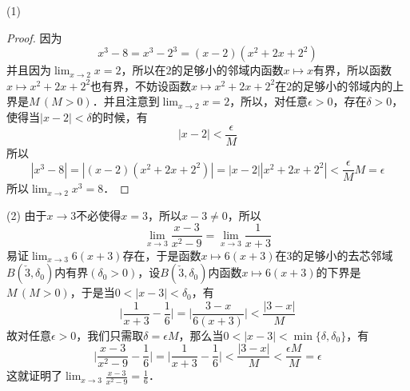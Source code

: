 (1)
\begin{proof}
因为
\begin{equation}
    x^3 - 8 = x^3 - 2^3 = (x-2)(x^2 + 2x + 2^2)
\end{equation}
并且因为$\displaystyle\lim_{x \to 2} x = 2$，所以在$2$的足够小的邻域内函数$x \longmapsto x$有界，所以函数$x \longmapsto x^2+2x+2^2$也有界，不妨设函数$x \longmapsto x^2+2x+2^2$在$2$的足够小的邻域内的上界是$M \, (M > 0)$．并且注意到$\displaystyle\lim_{x \to 2} x = 2$，所以，对任意$\epsilon > 0$，存在$\delta > 0$，使得当$|x - 2| < \delta$的时候，有
\begin{equation}
    |x - 2| < \frac{\epsilon}{M}
\end{equation}
所以
\begin{equation}
    |x^3-8|=|(x-2)(x^2+2x+2^2)|=|x-2||x^2+2x+2^2|<\frac{\epsilon}{M}M=\epsilon
\end{equation}
所以$\displaystyle\lim_{x \to 2} x^3 = 8$．
\end{proof} 

(2)
由于$x \to 3$不必使得$x = 3$，所以$x-3 \neq 0$，所以
\begin{equation}
    \lim_{x \to 3} \frac{x-3}{x^2 - 9} = \lim_{x \to 3} \frac{1}{x+3}
\end{equation}
易证$\displaystyle\lim_{x \to 3} 6(x+3)$存在，于是函数$x \longmapsto 6(x+3)$在$3$的足够小的去芯邻域$B(\check{3}, \delta_0)$内有界$(\delta_0 > 0)$，设$B(\check{3}, \delta_0)$内函数$x \longmapsto 6(x+3)$的下界是$M \, (M > 0)$，于是当$0<|x-3|<\delta_0$，有
\begin{equation}
    \bigg\lvert \frac{1}{x+3}-\frac{1}{6} \bigg\rvert= \bigg\lvert \frac{3-x}{6(x+3)} \bigg\rvert<\frac{|3-x|}{M}
\end{equation}
故对任意$\epsilon > 0$，我们只需取$\delta = \epsilon M$，那么当$0<|x-3|<\min\{\delta, \delta_0 \}$，有
\begin{equation}
    \bigg\lvert \frac{x-3}{x^2-9} - \frac{1}{6} \bigg\rvert = \bigg\lvert \frac{1}{x+3} - \frac{1}{6} \bigg\rvert < \frac{|3-x|}{M} < \frac{\epsilon M}{M} = \epsilon
\end{equation}
这就证明了$\displaystyle\lim_{x \to 3} \displaystyle\frac{x-3}{x^2-9} = \displaystyle\frac{1}{6}$．

